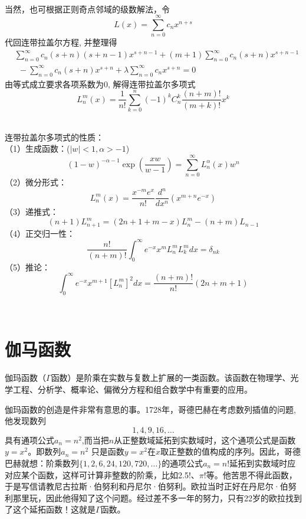 		~~\\ 
			当然，也可根据正则奇点邻域的级数解法，令 
			$$
			L(x)=\sum_{n=0}^{\infty} c_n x^{n+s}
			$$
			代回连带拉盖尔方程, 并整理得
			$$
		\begin{aligned}
		& \sum_{n=0}^{\infty} c_n(s+n)(s+n-1) x^{s+n-1}+(m+1) \sum_{n=0}^{\infty} c_n(s+n) x^{s+n-1} \\
		& ~~ -\sum_{n=0}^{\infty} c_n(s+n) x^{s+n}+\lambda \sum_{n=0}^{\infty} c_n x^{s+n}=0
		\end{aligned}
		$$
		由等式成立要求各项系数为0, 解得连带拉盖尔多项式
		\begin{equation*}
			L^m _n (x)= \frac{1} {n!}  \sum_{k=0}^{n} (-1)^k C^k _n \frac{(n+m)!}{(m+k)!}x^k
		\end{equation*}	
	
		~~\\ 
		连带拉盖尔多项式的性质：\\
		（1）生成函数：($\left\vert w \right\vert < 1, \alpha > -1$)
			$$
	(1-w)^{-\alpha-1} \exp \left(\frac{x w}{w-1}\right)=\sum_{n=0}^{\infty} L_n^\alpha(x) w^n
	$$
		（2）微分形式： 
				\begin{equation*}
					L^m _n(x) =\frac{x^{-m}e^x  }{n!} \frac{d ^n}{d x^n} (x^{m+n} e^{-x})
				\end{equation*}
		（3）递推式：
				\begin{equation*}
					(n+1)	L^m _{n+1} = (2n+1+m -x) L^m _n  - (n+m)  L_{n-1}  
				\end{equation*}	
		（4）正交归一性：
				\begin{equation*}
					\frac{n!}{(n+m)!}\int_{0}^{\infty}  e^{-x} x^m  L^m _n L^ m _k dx =\delta _{nk}
				\end{equation*}				
		（5）推论：
				\begin{equation*}
					\int_{0}^{\infty}  e^{-x} x^{m+1}  [L^m _{n}]^2  dx = \frac{(n+m)!}{n!}  (2n+m+1)
			\end{equation*}				
	
	~~\\ 
	\section{伽马函数}
	伽玛函数（$\Gamma$函数）是阶乘在实数与复数上扩展的一类函数。该函数在物理学、光学工程、分析学、概率论、偏微分方程和组合数学中有重要的应用。
	
	伽玛函数的创造是件非常有意思的事。1728年，哥德巴赫在考虑数列插值的问题,他发现数列$$1,4,9,16,\ldots$$具有通项公式$a_n = n^2$,而当把$n$从正整数域延拓到实数域时，这个通项公式是函数$y=x^2$。即数列$a_n = n^2$ 只是函数$y=x^2$在$x$取正整数的值构成的序列。因此，哥德巴赫就想：阶乘数列$\{1,2,6,24,120,720,\ldots\}$的通项公式$a_n = n!$延拓到实数域时应对应某个函数，这样可计算非整数的阶乘，比如2.5!、$\pi !$等。他苦思不得此函数，于是写信请教尼古拉斯·伯努利和丹尼尔·伯努利。欧拉当时正好在丹尼尔·伯努利那里玩，因此他得知了这个问题。经过差不多一年的努力，只有22岁的欧拉找到了这个延拓函数！这就是$\Gamma$函数。
	
